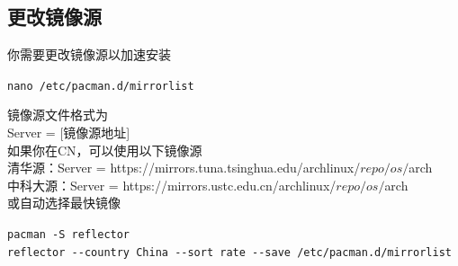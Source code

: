 \documentclass{article}
\newenvironment{singlecolumn}{%
	\par
	\noindent
	\begin{minipage}[t]{\textwidth} %
		\setlength{\parfillskip}{0pt plus 1fil} %
	}{%
	\end{minipage}
	\par
}
\begin{document}
\begin{singlecolumn}
\medskip

\begin{tcolorbox}
\section*{更改镜像源}
\end{tcolorbox}

你需要更改镜像源以加速安装\\
\begin{tcolorbox}[
	title=bash,
	boxrule=1pt,
	fonttitle=\bfseries,
	listing only, 
	listing options={language=bash}
	]
	\verb|nano /etc/pacman.d/mirrorlist|\\
\end{tcolorbox}
镜像源文件格式为\\
\textcolor{code}{Server = [镜像源地址]}\\
如果你在CN，可以使用以下镜像源\\
清华源：\textcolor{code}{Server = https://mirrors.tuna.tsinghua.edu/archlinux/$repo/os/$arch}\\
中科大源：\textcolor{code}{Server = https://mirrors.ustc.edu.cn/archlinux/$repo/os/$arch}\\
或自动选择最快镜像\\
\begin{tcolorbox}[
	title=bash,
	boxrule=1pt,
	fonttitle=\bfseries,
	listing only, 
	listing options={language=bash}
	]
	\verb|pacman -S reflector|\\
	\verb|reflector --country China --sort rate --save /etc/pacman.d/mirrorlist|\\
\end{tcolorbox}

\medskip

\end{singlecolumn}
\pagebreak
\end{document}
